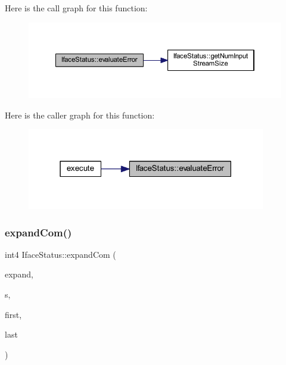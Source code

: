 Here is the call graph for this function\+:
\nopagebreak
\begin{figure}[H]
\begin{center}
\leavevmode
\includegraphics[width=350pt]{class_iface_status_a07467671ab32029fffb11bad9f7c634e_cgraph}
\end{center}
\end{figure}
Here is the caller graph for this function\+:
\nopagebreak
\begin{figure}[H]
\begin{center}
\leavevmode
\includegraphics[width=295pt]{class_iface_status_a07467671ab32029fffb11bad9f7c634e_icgraph}
\end{center}
\end{figure}
\mbox{\label{class_iface_status_adb7a0b05e7487a3f75dcb3de2a447b45}} 
\subsubsection{\texorpdfstring{expandCom()}{expandCom()}}
{\footnotesize\ttfamily int4 Iface\+Status\+::expand\+Com (\begin{DoxyParamCaption}\item[{vector$<$ string $>$ \&}]{expand,  }\item[{istream \&}]{s,  }\item[{vector$<$ \mbox{\hyperlink{class_iface_command}{Iface\+Command}} $\ast$ $>$\+::const\+\_\+iterator \&}]{first,  }\item[{vector$<$ \mbox{\hyperlink{class_iface_command}{Iface\+Command}} $\ast$ $>$\+::const\+\_\+iterator \&}]{last }\end{DoxyParamCaption})\hspace{0.3cm}{\ttfamily [protected]}}



